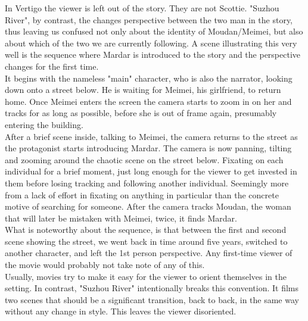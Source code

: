 \documentclass[fleqn,14pt]{article}
\begin{document}
In Vertigo the viewer is left out of the story. They are not Scottie. "Suzhou River", by contrast,
the changes perspective between the two man in the story, thus leaving us confused
not only about the identity of Moudan/Meimei, but also about which of the two we are currently following. 
A scene illustrating this very well is the sequence where Mardar is introduced to the story and the perspective
changes for the first time.
\\ It begins with the nameless "main" character, who is also the narrator, looking down onto
a street below. He is waiting for Meimei, his girlfriend, to return home. Once Meimei enters the screen
the camera starts to zoom in on her and tracks for as long as possible, before she is out of frame again,
presumably entering the building. \\
After a brief scene inside, talking to Meimei, the camera returns to the street as the protagonist starts introducing Mardar. 
The camera is now panning, tilting and zooming around the chaotic scene on the street below.
Fixating on each individual for a brief moment, just long enough for the viewer to get invested
in them before losing tracking and following another individual. Seemingly more from a lack of effort in fixating on anything
in particular than the concrete motive of searching for someone. After the camera tracks Moudan, the woman that will later be
mistaken with Meimei, twice, it finds Mardar. \\
What is noteworthy about the sequence, is that between the first and second scene showing the street, we went back in time 
around five years, switched to another character, and left the 1st person perspective. Any first-time viewer of the movie 
would probably not take note of any of this. \\
Usually, movies try to make it easy for the viewer to orient themselves in the setting.
In contrast, "Suzhou River" intentionally breaks this convention. It films two scenes that should be a significant transition,
back to back, in the same way without any change in style. This leaves the viewer disoriented. \\
\end{document}
